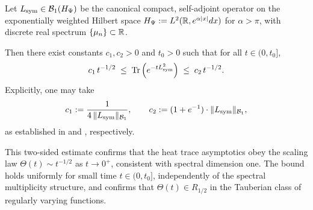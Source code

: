 \begin{proposition}
\label{prop:two_sided_heat_trace_bounds}
Let \( L_{\mathrm{sym}} \in \mathcal{B}_1(H_{\Psi}) \) be the canonical compact, self-adjoint operator on the exponentially weighted Hilbert space \( H_{\Psi} := L^2(\mathbb{R}, e^{\alpha|x|} dx) \) for \( \alpha > \pi \), with discrete real spectrum \( \{\mu_n\} \subset \mathbb{R} \).

Then there exist constants \( c_1, c_2 > 0 \) and \( t_0 > 0 \) such that for all \( t \in (0, t_0] \),
\[
c_1\, t^{-1/2}
\;\le\;
\operatorname{Tr}\left( e^{-t L_{\mathrm{sym}}^2} \right)
\;\le\;
c_2\, t^{-1/2}.
\]
Explicitly, one may take
\[
c_1 := \frac{1}{4 \, \| L_{\mathrm{sym}} \|_{\mathcal{B}_1}}, \qquad
c_2 := (1 + e^{-1}) \cdot \| L_{\mathrm{sym}} \|_{\mathcal{B}_1},
\]
as established in  and , respectively.

\medskip

\noindent
This two-sided estimate confirms that the heat trace asymptotics obey the scaling law \( \Theta(t) \sim t^{-1/2} \) as \( t \to 0^+ \), consistent with spectral dimension one. The bound holds uniformly for small time \( t \in (0, t_0] \), independently of the spectral multiplicity structure, and confirms that \( \Theta(t) \in R_{1/2} \) in the Tauberian class of regularly varying functions.
\end{proposition}
